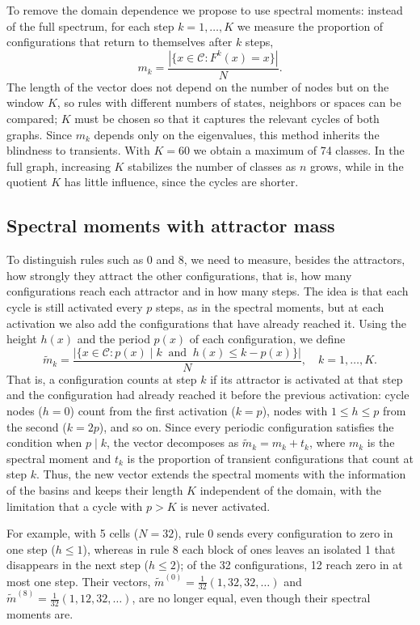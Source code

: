 To remove the domain dependence we propose to use spectral moments: instead of the full spectrum, for each step $k = 1, \dots, K$ we measure the proportion of configurations that return to themselves after $k$ steps,
\[
  m_k = \frac{|\{x \in \mathcal{C} : F^k(x) = x\}|}{N}.
\]
The length of the vector does not depend on the number of nodes but on the window $K$, so rules with different numbers of states, neighbors or spaces can be compared; $K$ must be chosen so that it captures the relevant cycles of both graphs. Since $m_k$ depends only on the eigenvalues, this method inherits the blindness to transients. With $K = 60$ we obtain a maximum of 74 classes. In the full graph, increasing $K$ stabilizes the number of classes as $n$ grows, while in the quotient $K$ has little influence, since the cycles are shorter.

\subsection{Spectral moments with attractor mass}
\label{subsec:attractor_mass}

To distinguish rules such as 0 and 8, we need to measure, besides the attractors, how strongly they attract the other configurations, that is, how many configurations reach each attractor and in how many steps. The idea is that each cycle is still activated every $p$ steps, as in the spectral moments, but at each activation we also add the configurations that have already reached it. Using the height $h(x)$ and the period $p(x)$ of each configuration, we define
\[
  \tilde{m}_k = \frac{|\{x \in \mathcal{C} : p(x) \mid k \ \text{ and } \ h(x) \le k - p(x)\}|}{N}, \quad k = 1, \dots, K.
\]
That is, a configuration counts at step $k$ if its attractor is activated at that step and the configuration had already reached it before the previous activation: cycle nodes ($h = 0$) count from the first activation ($k = p$), nodes with $1 \le h \le p$ from the second ($k = 2p$), and so on. Since every periodic configuration satisfies the condition when $p \mid k$, the vector decomposes as $\tilde{m}_k = m_k + t_k$, where $m_k$ is the spectral moment and $t_k$ is the proportion of transient configurations that count at step $k$. Thus, the new vector extends the spectral moments with the information of the basins and keeps their length $K$ independent of the domain, with the limitation that a cycle with $p > K$ is never activated.

For example, with 5 cells ($N = 32$), rule 0 sends every configuration to zero in one step ($h \le 1$), whereas in rule 8 each block of ones leaves an isolated 1 that disappears in the next step ($h \le 2$); of the 32 configurations, 12 reach zero in at most one step. Their vectors, $\tilde{m}^{(0)} = \tfrac{1}{32}(1, 32, 32, \dots)$ and $\tilde{m}^{(8)} = \tfrac{1}{32}(1, 12, 32, \dots)$, are no longer equal, even though their spectral moments are.


